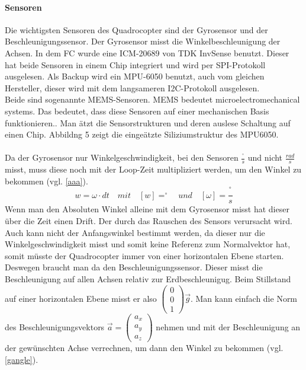 \documentclass[12pt,a4paper, ngerman]{article}
\begin{document}
\paragraph{Sensoren}
Die wichtigsten Sensoren des Quadrocopter sind der Gyrosensor und der Beschleunigungssensor. Der Gyrosensor misst die Winkelbeschleunigung der Achsen. In dem FC wurde eine ICM-20689 von TDK InvSense benutzt. Dieser hat beide Sensoren in einem Chip integriert und wird per SPI-Protokoll ausgelesen. Als Backup wird ein MPU-6050 benutzt, auch vom gleichen Hersteller, dieser wird mit dem langsameren I2C-Protokoll ausgelesen. \\
Beide sind sogenannte MEMS-Sensoren. MEMS bedeutet microelectromechanical systems. Das bedeutet, dass diese Sensoren auf einer mechanischen Basis funktionieren.\cite{website:elek_Komp_MEMS}. Man ätzt die Sensorstrukturen und deren auslese Schaltung auf einen Chip. Abbildng 5 zeigt die eingeätzte Siliziumstruktur des MPU6050.\\ \\
Da der Gyrosensor nur Winkelgeschwindigkeit, bei den Sensoren $\frac{^\circ}{s}$ und nicht $\frac{rad}{s}$ misst, muss diese noch mit der Loop-Zeit multipliziert werden, um den Winkel zu bekommen (vgl. \ref{aaa}).
\begin{equation}\label{aaa}
w=\omega\cdot dt \quad mit \quad [w]=^\circ \quad und \quad [\omega]=\frac{^\circ}{s}
\end{equation}
Wenn man den Absoluten Winkel alleine mit dem Gyrosensor misst hat dieser über die Zeit einen Drift. Der durch das Rauschen des Sensors verursacht wird. Auch kann nicht der Anfangswinkel bestimmt werden, da dieser nur die Winkelgeschwindigkeit misst und somit keine Referenz zum Normalvektor hat, somit müsste der Quadrocopter immer von einer horizontalen Ebene starten. Deswegen braucht man da den Beschleunigungssensor. Dieser misst die Beschleunigung auf allen Achsen relativ zur Erdbeschleunigug. Beim Stillstand auf einer horizontalen Ebene misst er also
$
\begin{pmatrix}
0\\ 
0\\ 
1
\end{pmatrix}
\vec{g}
$. Man kann einfach die Norm des Beschleunigungsvektors $\vec{a} = \begin{pmatrix}
a_{x}\\ 
a_{y}\\ 
a_{z}
\end{pmatrix}$ nehmen und mit der Beschleunigung an der gewünschten Achse verrechnen, um dann den Winkel zu bekommen (vgl. \ref{gangle}).
\end{document}
